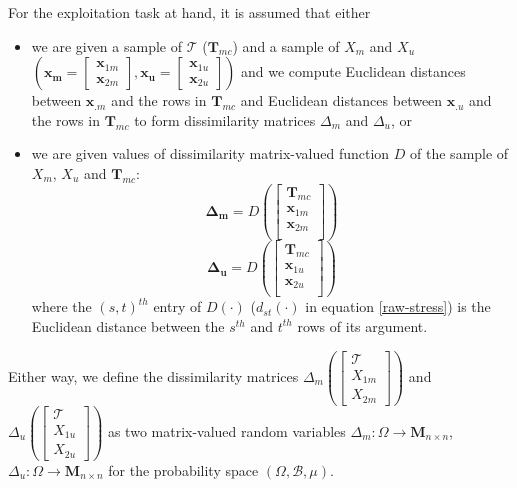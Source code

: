 \documentclass[11pt]{article} %
\begin{document}
For the exploitation task at hand, it is assumed that either
\begin{itemize}
\item  we are given a sample of $\mathcal{T}$ ($\mathbf{T}_{mc}$) and a sample of $X_m$ and  $X_u$ 
$\left(\bm{x_m}=\left[
 \begin{array}{c}
\bm{x}_{1m}\\
\bm{x}_{2m}
\end{array}
\right] ,\bm{x_u}=\left[
 \begin{array}{c}
 \bm{x}_{1u}\\
 \bm{x}_{2u} 
\end{array}
\right]\right)$ 
 and  we compute Euclidean distances between  $\bm{x}_{.m}$ and the rows in  $\mathbf{T}_{mc}$  and Euclidean distances between  $\bm{x}_{.u}$ and the rows in  $\mathbf{T}_{mc}$ to form  dissimilarity matrices $\Delta_m$ and $\Delta_u$, or
\item we are given values of  dissimilarity matrix-valued function $D$ of  the sample of $X_m$, $X_u$ and $\mathbf{T}_{mc}$: $$
\mathbf{\Delta_m} = D \left( \left[
 \begin{array}{c}
\mathbf{T}_{mc}  \\
\bm{x}_{1m}\\
\bm{x}_{2m}\\
\end{array}
\right]
\right)
$$
$$
\mathbf{\Delta_u}=D \left( \left[
 \begin{array}{c}
\mathbf{T}_{mc}  \\
\bm{x}_{1u}\\
\bm{x}_{2u}\\
\end{array}
\right]
\right)
$$
where the  $(s,t)^{th}$ entry of $D(\cdot)$   ($d_{st}(\cdot)$ in equation \eqref{raw-stress})  is the Euclidean distance between the $s^{th}$ and $t^{th}$ rows of its argument.
\end{itemize}

Either way, we define the dissimilarity matrices $\Delta_{m} \left(\left[
\begin{array}{c}
\mathcal{T} \\
X_{1m} \\
X_{2m} 
\end {array}
\right]
\right)$  and 
 $\Delta_{u} \left(\left[
\begin{array}{c}
\mathcal{T}\\
X_{1u} \\
X_{2u}
\end {array}
\right]\right)$ as two matrix-valued random variables $\Delta_{m}:\Omega \rightarrow \mathbf{M}_{n\times n} $,$\Delta_{u}:\Omega \rightarrow \mathbf{M}_{n\times n} $  for the probability space $(\Omega,\mathcal{B},\mu)$.
\end{document}

